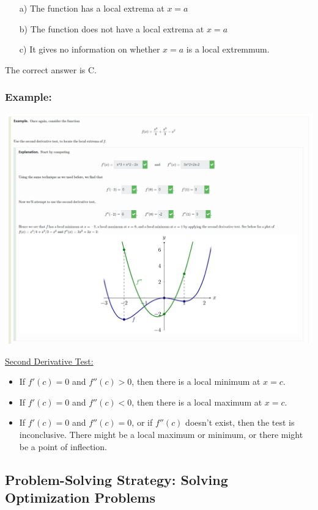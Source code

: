 \documentclass{article}
\begin{document}
\begin{enumerate}
    \item[a)] The function has a local extrema at $x=a$
    \item[b)] The function does not have a local extrema at $x=a$
    \item[c)] It gives no information on whether $x=a$ is a local extremmum.
\end{enumerate}
The correct answer is C.
\subsubsection*{Example:}
\begin{center}
\begin{minipage}{\linewidth}
    \centering
    \includegraphics[width=1.3\textwidth]{imgs/ex4.png}
\end{minipage}
\end{center}
\underline{Second Derivative Test:}

\begin{itemize}
\item If $f'(c)=0$ and $f''(c)>0$, then there is a local minimum at $x=c$.
\item If $f'(c)=0$ and $f''(c)<0$, then there is a local maximum at $x=c$.
\item If $f'(c)=0$ and $f''(c)=0$, or if $f''(c)$ doesn't exist, then the test is inconclusive. There might be a local maximum or minimum, or there might be a point of inflection.
\end{itemize}
\newpage 
\subsection{Problem-Solving Strategy: Solving Optimization Problems}
\end{document}
